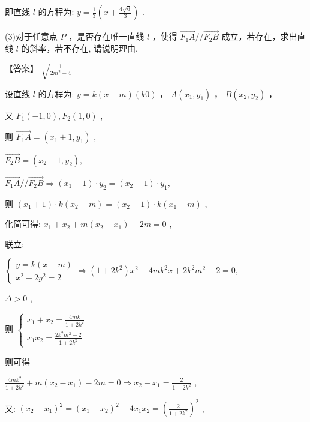 \documentclass[10pt]{article}
\begin{document}
即直线 \(l\) 的方程为: \(y = \frac{1}{3}\left( {x + \frac{4\sqrt{6}}{3}}\right)\) .

(3)对于任意点 \(P\) ，是否存在唯一直线 \(l\) ，使得 \(\overrightarrow{{F}_{1}A}//\overrightarrow{{F}_{2}B}\) 成立，若存在，求出直线 \(l\) 的斜率，若不存在, 请说明理由.

【答案】 \(\sqrt{\frac{1}{2{m}^{2} - 4}}\)

设直线 \(l\) 的方程为: \(y = k\left( {x - m}\right) \left( {k0}\right)\) ， \(A\left( {{x}_{1},{y}_{1}}\right)\) ， \(B\left( {{x}_{2},{y}_{2}}\right)\) ，

又 \({F}_{1}\left( {-1,0}\right) ,{F}_{2}\left( {1,0}\right)\) ,

则 \(\overrightarrow{{F}_{1}A} = \left( {{x}_{1} + 1,{y}_{1}}\right)\) ,

\(\overrightarrow{{F}_{2}B} = \left( {{x}_{2} + 1,{y}_{2}}\right) ,\)

\(\overrightarrow{{F}_{1}A}//\overrightarrow{{F}_{2}B} \Rightarrow  \left( {{x}_{1} + 1}\right)  \cdot  {y}_{2} = \left( {{x}_{2} - 1}\right)  \cdot  {y}_{1},\)

则 \(\left( {{x}_{1} + 1}\right)  \cdot  k\left( {{x}_{2} - m}\right)  = \left( {{x}_{2} - 1}\right)  \cdot  k\left( {{x}_{1} - m}\right)\) ,

化简可得: \({x}_{1} + {x}_{2} + m\left( {{x}_{2} - {x}_{1}}\right)  - {2m} = 0\) ,

联立:

\(\left\{  {\begin{array}{l} y = k\left( {x - m}\right) \\  {x}^{2} + 2{y}^{2} = 2 \end{array} \Rightarrow  \left( {1 + 2{k}^{2}}\right) {x}^{2} - {4m}{k}^{2}x + 2{k}^{2}{m}^{2} - 2 = 0,}\right.\)

\(\Delta  > 0\) ,

则 \(\left\{  \begin{array}{l} {x}_{1} + {x}_{2} = \frac{4mk}{1 + 2{k}^{2}} \\  {x}_{1}{x}_{2} = \frac{2{k}^{2}{m}^{2} - 2}{1 + 2{k}^{2}} \end{array}\right.\)

则可得

\(\frac{{4m}{k}^{2}}{1 + 2{k}^{2}} + m\left( {{x}_{2} - {x}_{1}}\right)  - {2m} = 0 \Rightarrow  {x}_{2} - {x}_{1} = \frac{2}{1 + 2{k}^{2}}\) ,

又: \({\left( {x}_{2} - {x}_{1}\right) }^{2} = {\left( {x}_{1} + {x}_{2}\right) }^{2} - 4{x}_{1}{x}_{2} = {\left( \frac{2}{1 + 2{k}^{2}}\right) }^{2}\) ,
\end{document}
